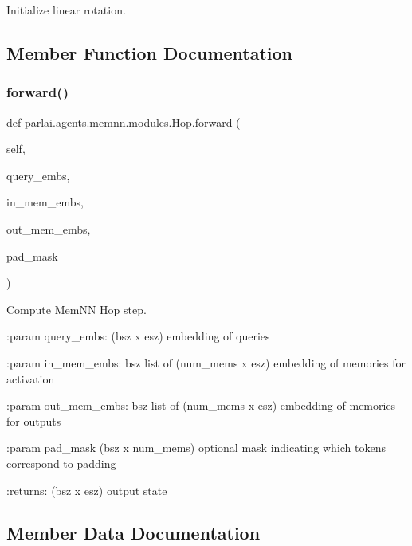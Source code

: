 \begin{DoxyVerb}Initialize linear rotation.
\end{DoxyVerb}
 

\subsection{Member Function Documentation}
\mbox{\label{classparlai_1_1agents_1_1memnn_1_1modules_1_1Hop_ad4e6c91364efc31ac3f0239d7a7c1376}} 
\subsubsection{\texorpdfstring{forward()}{forward()}}
{\footnotesize\ttfamily def parlai.\+agents.\+memnn.\+modules.\+Hop.\+forward (\begin{DoxyParamCaption}\item[{}]{self,  }\item[{}]{query\+\_\+embs,  }\item[{}]{in\+\_\+mem\+\_\+embs,  }\item[{}]{out\+\_\+mem\+\_\+embs,  }\item[{}]{pad\+\_\+mask }\end{DoxyParamCaption})}

\begin{DoxyVerb}Compute MemNN Hop step.

:param query_embs:
    (bsz x esz) embedding of queries

:param in_mem_embs:
    bsz list of (num_mems x esz) embedding of memories for activation

:param out_mem_embs:
    bsz list of (num_mems x esz) embedding of memories for outputs

:param pad_mask
    (bsz x num_mems) optional mask indicating which tokens correspond to
    padding

:returns:
    (bsz x esz) output state
\end{DoxyVerb}
 

\subsection{Member Data Documentation}
\mbox{\label{classparlai_1_1agents_1_1memnn_1_1modules_1_1Hop_a88857c10815bc48ef24c78ecf367935d}} 
